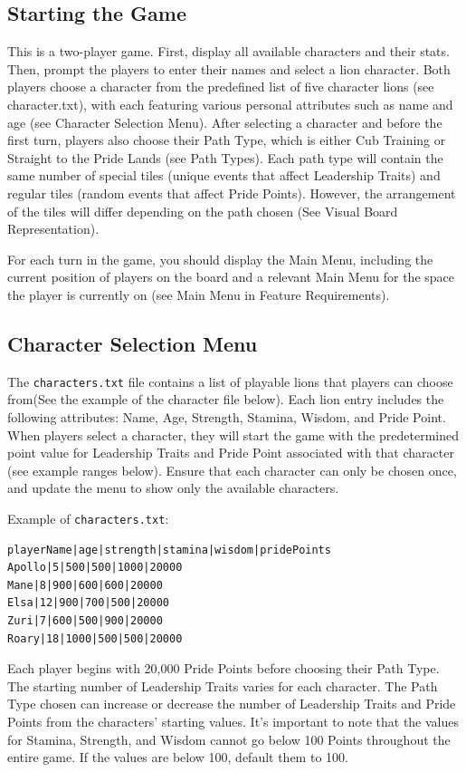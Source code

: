 \subsection{Starting the Game}
This is a two-player game. First, display all available characters and their stats. Then, prompt the players to enter their names and select a lion character. Both players choose a character from the predefined list of five character lions (see character.txt), with each featuring various personal attributes such as name and age (see Character Selection Menu). After selecting a character and before the first turn, players also choose their Path Type, which is either Cub Training or Straight to the Pride Lands (see Path Types). Each path type will contain the same number of special tiles (unique events that affect Leadership Traits) and regular tiles (random events that affect Pride Points). However, the arrangement of the tiles will differ depending on the path chosen (See Visual Board Representation). %

For each turn in the game, you should display the Main Menu, including the current position of players on the board and a relevant Main Menu for the space the player is currently on (see Main Menu in Feature Requirements).

\subsection{Character Selection Menu}
The \verb|characters.txt| file contains a list of playable lions that players can choose from(See the example of the character file below). Each lion entry includes the following attributes: Name, Age, Strength, Stamina, Wisdom, and Pride Point. When players select a character, they will start the game with the predetermined point value for Leadership Traits and Pride Point associated with that character (see example ranges below). Ensure that each character can only be chosen once, and update the menu to show only the available characters. 

Example of \verb|characters.txt|:
\begin{verbatim}
playerName|age|strength|stamina|wisdom|pridePoints
Apollo|5|500|500|1000|20000
Mane|8|900|600|600|20000
Elsa|12|900|700|500|20000
Zuri|7|600|500|900|20000
Roary|18|1000|500|500|20000
\end{verbatim}

Each player begins with 20,000 Pride Points before choosing their Path Type. The starting number of Leadership Traits varies for each character. The Path Type chosen can increase or decrease the number of Leadership Traits and Pride Points from the characters' starting values. It's important to note that the values for Stamina, Strength, and Wisdom cannot go below 100 Points throughout the entire game. If the values are below 100, default them to 100. %


